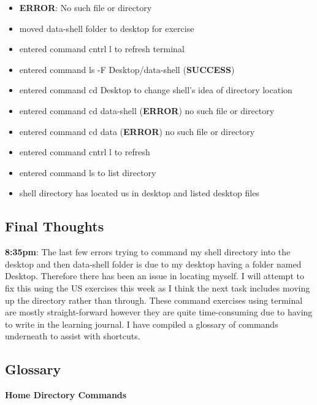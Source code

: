 \documentclass{article}
\begin{document}
\begin{itemize}
\item \textbf{ERROR}: No such file or directory
\item moved data-shell folder to desktop for exercise
\item entered command cntrl l to refresh terminal
\item entered command ls -F Desktop/data-shell (\textbf{SUCCESS})
\item entered command cd Desktop to change shell's idea of directory location
\item entered command cd data-shell (\textbf{ERROR}) no such file or directory
\item entered command cd data (\textbf{ERROR}) no such file or directory
\item entered command cntrl l to refresh
\item entered command ls to list directory 
\item shell directory has located us in desktop and listed desktop files

\end{itemize}
\subsection{Final Thoughts}
\textbf{8:35pm}: The last few errors trying to command my shell directory into the desktop and then data-shell folder is due to my desktop having a folder named Desktop. Therefore there has been an issue in locating myself. I will attempt to fix this using the US exercises this week as I think the next task includes moving up the directory rather than through. These command exercises using terminal are mostly straight-forward however they are quite time-consuming due to having to write in the learning journal. I have compiled a glossary of commands underneath to assist with shortcuts.

\subsection{Glossary}
\textbf{Home Directory Commands}
\end{document}

